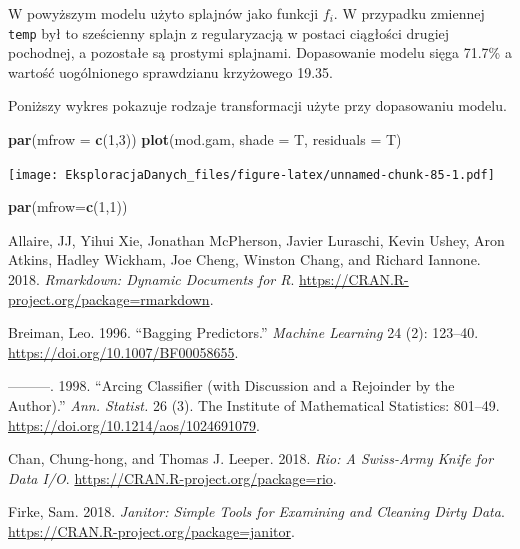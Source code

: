 \documentclass[]{book}
\newenvironment{Shaded}{\begin{snugshade}}{\end{snugshade}}
\newcommand{\DataTypeTok}[1]{\textcolor[rgb]{0.13,0.29,0.53}{#1}}
\newcommand{\DecValTok}[1]{\textcolor[rgb]{0.00,0.00,0.81}{#1}}
\newcommand{\KeywordTok}[1]{\textcolor[rgb]{0.13,0.29,0.53}{\textbf{#1}}}
\newcommand{\NormalTok}[1]{#1}
\theoremstyle{plain}
\theoremstyle{definition}
\theoremstyle{definition}
\theoremstyle{definition}
\theoremstyle{definition}
\theoremstyle{remark}
\begin{document}
W powyższym modelu użyto splajnów jako funkcji \(f_i\). W przypadku zmiennej \texttt{temp} był to sześcienny splajn z regularyzacją w postaci ciągłości drugiej pochodnej, a pozostałe są prostymi splajnami. Dopasowanie modelu sięga 71.7\% a wartość uogólnionego sprawdzianu krzyżowego 19.35.

Poniższy wykres pokazuje rodzaje transformacji użyte przy dopasowaniu modelu.

\begin{Shaded}
\begin{Highlighting}[]
\KeywordTok{par}\NormalTok{(}\DataTypeTok{mfrow =} \KeywordTok{c}\NormalTok{(}\DecValTok{1}\NormalTok{,}\DecValTok{3}\NormalTok{))}
\KeywordTok{plot}\NormalTok{(mod.gam, }\DataTypeTok{shade =}\NormalTok{ T, }\DataTypeTok{residuals =}\NormalTok{ T)}
\end{Highlighting}
\end{Shaded}

\texttt{[image: EksploracjaDanych\_files/figure-latex/unnamed-chunk-85-1.pdf]}

\begin{Shaded}
\begin{Highlighting}[]
\KeywordTok{par}\NormalTok{(}\DataTypeTok{mfrow=}\KeywordTok{c}\NormalTok{(}\DecValTok{1}\NormalTok{,}\DecValTok{1}\NormalTok{))}
\end{Highlighting}
\end{Shaded}

\hypertarget{refs}{}
\leavevmode\hypertarget{ref-R-rmarkdown}{}%
Allaire, JJ, Yihui Xie, Jonathan McPherson, Javier Luraschi, Kevin Ushey, Aron Atkins, Hadley Wickham, Joe Cheng, Winston Chang, and Richard Iannone. 2018. \emph{Rmarkdown: Dynamic Documents for R}. \url{https://CRAN.R-project.org/package=rmarkdown}.

\leavevmode\hypertarget{ref-breiman1996}{}%
Breiman, Leo. 1996. ``Bagging Predictors.'' \emph{Machine Learning} 24 (2): 123--40. \url{https://doi.org/10.1007/BF00058655}.

\leavevmode\hypertarget{ref-breiman1998}{}%
---------. 1998. ``Arcing Classifier (with Discussion and a Rejoinder by the Author).'' \emph{Ann. Statist.} 26 (3). The Institute of Mathematical Statistics: 801--49. \url{https://doi.org/10.1214/aos/1024691079}.

\leavevmode\hypertarget{ref-R-rio}{}%
Chan, Chung-hong, and Thomas J. Leeper. 2018. \emph{Rio: A Swiss-Army Knife for Data I/O}. \url{https://CRAN.R-project.org/package=rio}.

\leavevmode\hypertarget{ref-R-janitor}{}%
Firke, Sam. 2018. \emph{Janitor: Simple Tools for Examining and Cleaning Dirty Data}. \url{https://CRAN.R-project.org/package=janitor}.
\end{document}
